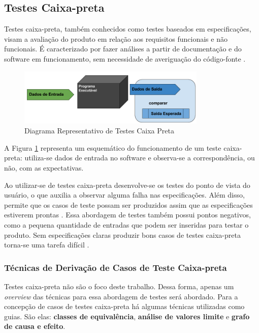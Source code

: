 \subsection{Testes Caixa-preta}
Testes caixa-preta, também conhecidos como testes baseados em especificações, visam a avaliação do produto em relação aos requisitos funcionais e não funcionais. É caracterizado por fazer análises a partir de documentação e do software em funcionamento, sem necessidade de averiguação do código-fonte \cite{barbosa_et_al_2009}.

\begin{figure}[h]
  \centering
    \includegraphics[width=0.8\textwidth]{figuras/test_black_box.png}
    \caption{Diagrama Representativo de Testes Caixa Preta}
    \label{test_black_box}
\end{figure}

A Figura \ref{test_black_box} representa um esquemático do funcionamento de um teste caixa-preta: utiliza-se dados de entrada no software e observa-se a correspondência, ou não, com as expectativas.
\par
\indent Ao utilizar-se de testes caixa-preta desenvolve-se os testes do ponto de vista do usuário, o que auxilia a observar alguma falha nas especificações. Além disso, permite que os casos de teste possam ser produzidos assim que as especificações estiverem prontas \cite{stf_2010}. Essa abordagem de testes também possui pontos negativos, como a pequena quantidade de entradas que podem ser inseridas para testar o produto. Sem especificações claras produzir bons casos de testes caixa-preta torna-se uma tarefa difícil \cite{stf_2010}.

\subsubsection{Técnicas de Derivação de Casos de Teste Caixa-preta}
Testes caixa-preta não são o foco deste trabalho. Dessa forma, apenas um \textit{overview} das técnicas para essa abordagem de testes será abordado. Para a concepção de casos de testes caixa-preta há algumas técnicas utilizadas como guias. São elas: \textbf{classes de equivalência}, \textbf{análise de valores limite} e \textbf{grafo de causa e efeito}.

